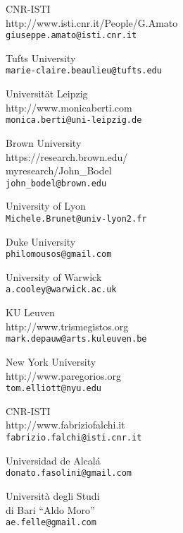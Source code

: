 


\begin{contributors}


{ CNR-ISTI	  \\
{http://www.isti.cnr.it/People/G.Amato }\\
\texttt{giuseppe.amato@isti.cnr.it}
}

{   Tufts University	\\
\texttt{marie-claire.beaulieu@tufts.edu}
}
	

{ Universität Leipzig  \\
{http://www.monicaberti.com} \\
\texttt{monica.berti@uni-leipzig.de}
}

		
{ Brown University	  \\
{https://research.brown.edu/\\myresearch/John\_Bodel} \\
\texttt{john\_bodel@brown.edu}
}
			
			
{  University of Lyon \\
\texttt{Michele.Brunet@univ-lyon2.fr}
}
	
	
{  Duke University	 \\
\texttt{philomousos@gmail.com}
}
	
			
{ University of Warwick	  \\
\texttt{a.cooley@warwick.ac.uk}
}


{ KU Leuven	  \\
{http://www.trismegistos.org}	 \\
\texttt{mark.depauw@arts.kuleuven.be}
}
		

{ New York University  \\
{http://www.paregorios.org} \\
\texttt{tom.elliott@nyu.edu}
}
	
	
{  CNR-ISTI	 \\
{http://www.fabriziofalchi.it} \\
\texttt{fabrizio.falchi@isti.cnr.it}
}
	
{ Universidad de Alcalá	  \\
\texttt{donato.fasolini@gmail.com	}
}
	
	
{  Università degli Studi\\ di Bari ``Aldo Moro'' \\
\texttt{ae.felle@gmail.com}
}



\end{contributors}

